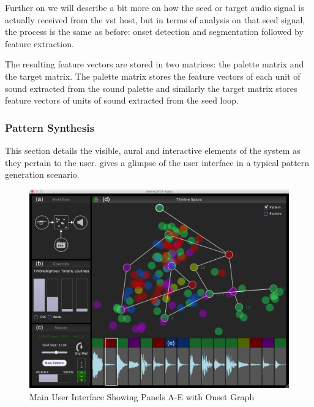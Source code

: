 Further on we will describe a bit more on how the seed or target audio signal is actually received from the \acrshort{vst} host, but in terms of analysis on that seed signal, the process is the same as before: onset detection and segmentation followed by feature extraction.

The resulting feature vectors are stored in two matrices: the palette matrix and the target matrix. The palette matrix stores the feature vectors of each unit of sound extracted from the sound palette and similarly the target matrix stores feature vectors of units of sound extracted from the seed loop.

\subsubsection{Pattern Synthesis}

This section details the visible, aural and interactive elements of the system as they pertain to the user.  gives a glimpse of the user interface in a typical pattern generation scenario.

\begin{figure}
	\begin{center}
		\includegraphics[scale=0.45]{ch05_pyconcat/figures/rhythmcat.png}		
		\end{center}
		\caption[Main User Interface Showing Panels A-E with Onset Graph]{Main User Interface Showing Panels A-E with Onset Graph}
	\label{fig:rhythmcat_interface}
\end{figure}

